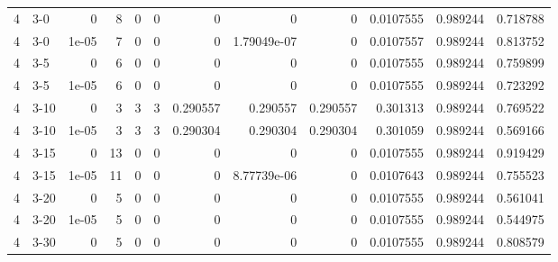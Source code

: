 \begin{tabular}{rlrrrrrrrrrr}
     4 & 3-0    &      0     &           8 &                 0 &                 0 &     0           &     0           &      0           &        0.0107555 &               0.989244 &           0.718788 \\
     4 & 3-0    &      1e-05 &           7 &                 0 &                 0 &     0           &     1.79049e-07 &      0           &        0.0107557 &               0.989244 &           0.813752 \\
     4 & 3-5    &      0     &           6 &                 0 &                 0 &     0           &     0           &      0           &        0.0107555 &               0.989244 &           0.759899 \\
     4 & 3-5    &      1e-05 &           6 &                 0 &                 0 &     0           &     0           &      0           &        0.0107555 &               0.989244 &           0.723292 \\
     4 & 3-10   &      0     &           3 &                 3 &                 3 &     0.290557    &     0.290557    &      0.290557    &        0.301313  &               0.989244 &           0.769522 \\
     4 & 3-10   &      1e-05 &           3 &                 3 &                 3 &     0.290304    &     0.290304    &      0.290304    &        0.301059  &               0.989244 &           0.569166 \\
     4 & 3-15   &      0     &          13 &                 0 &                 0 &     0           &     0           &      0           &        0.0107555 &               0.989244 &           0.919429 \\
     4 & 3-15   &      1e-05 &          11 &                 0 &                 0 &     0           &     8.77739e-06 &      0           &        0.0107643 &               0.989244 &           0.755523 \\
     4 & 3-20   &      0     &           5 &                 0 &                 0 &     0           &     0           &      0           &        0.0107555 &               0.989244 &           0.561041 \\
     4 & 3-20   &      1e-05 &           5 &                 0 &                 0 &     0           &     0           &      0           &        0.0107555 &               0.989244 &           0.544975 \\
     4 & 3-30   &      0     &           5 &                 0 &                 0 &     0           &     0           &      0           &        0.0107555 &               0.989244 &           0.808579 \\

\end{tabular}
